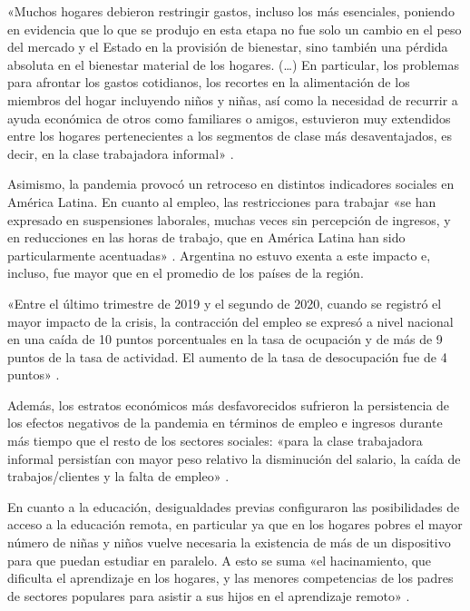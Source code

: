 \begin{refsection}
\begin{gbcita}
«Muchos hogares debieron restringir gastos, incluso los más esenciales, poniendo en evidencia que lo que se produjo en esta etapa no fue solo un cambio en el peso del mercado y el Estado en la provisión de bienestar, sino también una pérdida absoluta en el bienestar material de los hogares. (…) En particular, los problemas para afrontar los gastos cotidianos, los recortes en la alimentación de los miembros del hogar incluyendo niños y niñas, así como la necesidad de recurrir a ayuda económica de otros como familiares o amigos, estuvieron muy extendidos entre los hogares pertenecientes a los segmentos de clase más desaventajados, es decir, en la clase trabajadora informal» \protect\parencite[págs.~45-46]{4252-BENZA2022}.

\end{gbcita}

Asimismo, la pandemia provocó un retroceso en distintos indicadores sociales en América Latina. En cuanto al empleo, las restricciones para trabajar «se han expresado en suspensiones laborales, muchas veces sin percepción de ingresos, y en reducciones en las horas de trabajo, que en América Latina han sido particularmente acentuadas» \protect\parencite[pág.~17]{4253-BENZA2021}. Argentina no estuvo exenta a este impacto e, incluso, fue mayor que en el promedio de los países de la región.


\begin{gbcita}
«Entre el último trimestre de 2019 y el segundo de 2020, cuando se registró el mayor impacto de la crisis, la contracción del empleo se expresó a nivel nacional en una caída de 10 puntos porcentuales en la tasa de ocupación y de más de 9 puntos de la tasa de actividad. El aumento de la tasa de desocupación fue de 4 puntos» \protect\parencite[págs.~14-15]{4252-BENZA2022}.

\end{gbcita}

Además, los estratos económicos más desfavorecidos sufrieron la persistencia de los efectos negativos de la pandemia en términos de empleo e ingresos durante más tiempo que el resto de los sectores sociales: «para la clase trabajadora informal persistían con mayor peso relativo la disminución del salario, la caída de trabajos/clientes y la falta de empleo» \protect\parencite[pág.~18]{4252-BENZA2022}.

En cuanto a la educación, desigualdades previas configuraron las posibilidades de acceso a la educación remota, en particular ya que en los hogares pobres el mayor número de niñas y niños vuelve necesaria la existencia de más de un dispositivo para que puedan estudiar en paralelo. A esto se suma «el hacinamiento, que dificulta el aprendizaje en los hogares, y las menores competencias de los padres de sectores populares para asistir a sus hijos en el aprendizaje remoto» \protect\parencite[pág.~25]{4253-BENZA2021}.


\end{refsection}
